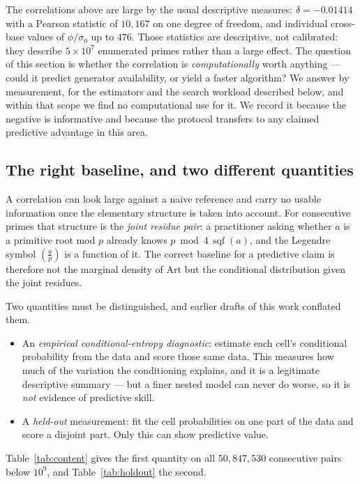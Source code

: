\documentclass[11pt,reqno]{amsart}
\theoremstyle{plain}
\theoremstyle{definition}
\DeclareMathOperator{\sqf}{sqf}
\newcommand{\Art}{\mathrm{Art}}
\newcommand{\Lsym}[2]{\left(\tfrac{#1}{#2}\right)}
\begin{document}
The correlations above are large by the usual descriptive measures: $\delta = -0.01414$ with a
Pearson statistic of $10{,}167$ on one degree of freedom, and individual cross-base values of
$\phi/\sigma_0$ up to $476$. Those statistics are descriptive, not calibrated: they describe
$5 \times 10^7$ enumerated primes rather than a large effect. The question of this section is
whether the correlation is \emph{computationally} worth anything --- could it predict generator
availability, or yield a faster algorithm? We answer by measurement, for the estimators and the
search workload described below, and within that scope we find no computational use for it. We
record it because the negative is informative and because the protocol transfers to any claimed
predictive advantage in this area.

\subsection*{The right baseline, and two different quantities}
A correlation can look large against a naive reference and carry no usable information once the
elementary structure is taken into account. For consecutive primes that structure is the
\emph{joint residue pair}: a practitioner asking whether $a$ is a primitive root mod $p$ already
knows $p \bmod 4\,\sqf(a)$, and the Legendre symbol $\Lsym{a}{p}$ is a function of it. The correct
baseline for a predictive claim is therefore not the marginal density of $\Art$ but the
conditional distribution given the joint residues.

Two quantities must be distinguished, and earlier drafts of this work conflated them.

\begin{itemize}
	\item An \emph{empirical conditional-entropy diagnostic}: estimate each cell's conditional
	probability from the data and score those same data. This measures how much of the
	variation the conditioning explains, and it is a legitimate descriptive summary --- but a
	finer nested model can never do worse, so it is \emph{not} evidence of predictive skill.
	\item A \emph{held-out} measurement: fit the cell probabilities on one part of the data and
	score a disjoint part. Only this can show predictive value.
\end{itemize}

Table~\ref{tab:content} gives the first quantity on all $50{,}847{,}530$ consecutive pairs below
$10^9$, and Table~\ref{tab:holdout} the second.
\end{document}
